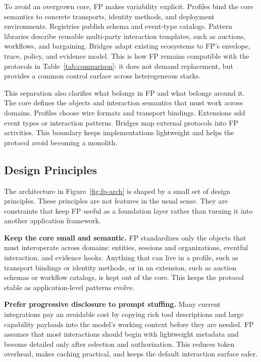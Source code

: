 \documentclass{foundationpaper}
\begin{document}
To avoid an overgrown core, FP makes variability explicit. Profiles bind the core semantics to concrete transports, identity methods, and deployment environments. Registries publish schema and event-type catalogs. Pattern libraries describe reusable multi-party interaction templates, such as auctions, workflows, and bargaining. Bridges adapt existing ecosystems to FP's envelope, trace, policy, and evidence model. This is how FP remains compatible with the protocols in Table~\ref{tab:comparison}: it does not demand replacement, but provides a common control surface across heterogeneous stacks.

This separation also clarifies what belongs in FP and what belongs around it. The core defines the objects and interaction semantics that must work across domains. Profiles choose wire formats and transport bindings. Extensions add event types or interaction patterns. Bridges map external protocols into FP activities. This boundary keeps implementations lightweight and helps the protocol avoid becoming a monolith.


\subsection{Design Principles}
\label{subsec:principles}

The architecture in Figure~\ref{fig:fp-arch} is shaped by a small set of design principles. These principles are not features in the usual sense. They are constraints that keep FP useful as a foundation layer rather than turning it into another application framework.

\textbf{Keep the core small and semantic.} FP standardizes only the objects that must interoperate across domains: entities, sessions and organizations, eventful interaction, and evidence hooks. Anything that can live in a profile, such as transport bindings or identity methods, or in an extension, such as auction schemas or workflow catalogs, is kept out of the core. This keeps the protocol stable as application-level patterns evolve.

\textbf{Prefer progressive disclosure to prompt stuffing.} Many current integrations pay an avoidable cost by copying rich tool descriptions and large capability payloads into the model's working context before they are needed. FP assumes that most interactions should begin with lightweight metadata and become detailed only after selection and authorization. This reduces token overhead, makes caching practical, and keeps the default interaction surface safer.
\end{document}

